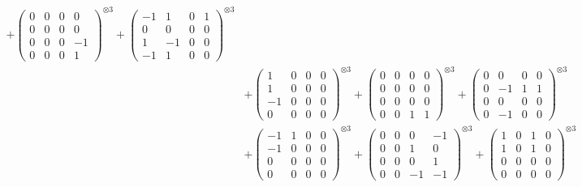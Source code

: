 \documentclass{article}
\begin{document}
{\begin{align}
            + \begin{pmatrix} 0 & 0 & 0 & 0 \\ 0 & 0 & 0 & 0 \\ 0 & 0 & 0 & -1 \\ 0 & 0 & 0 & 1 \end{pmatrix}^{\otimes 3} 
            + \begin{pmatrix} -1 & 1 & 0 & 1 \\ 0 & 0 & 0 & 0 \\ 1 & -1 & 0 & 0 \\ -1 & 1 & 0 & 0 \end{pmatrix}^{\otimes 3} \\
        &+ \label{Rs16-Rc11-Solution-12-c10} \begin{pmatrix} 1 & 0 & 0 & 0 \\ 1 & 0 & 0 & 0 \\ -1 & 0 & 0 & 0 \\ 0 & 0 & 0 & 0 \end{pmatrix}^{\otimes 3} 
            + \begin{pmatrix} 0 & 0 & 0 & 0 \\ 0 & 0 & 0 & 0 \\ 0 & 0 & 0 & 0 \\ 0 & 0 & 1 & 1 \end{pmatrix}^{\otimes 3} 
            + \begin{pmatrix} 0 & 0 & 0 & 0 \\ 0 & -1 & 1 & 1 \\ 0 & 0 & 0 & 0 \\ 0 & -1 & 0 & 0 \end{pmatrix}^{\otimes 3} \\
        &+ \label{Rs16-Rc11-Solution-12-c13} \begin{pmatrix} -1 & 1 & 0 & 0 \\ -1 & 0 & 0 & 0 \\ 0 & 0 & 0 & 0 \\ 0 & 0 & 0 & 0 \end{pmatrix}^{\otimes 3} 
            + \begin{pmatrix} 0 & 0 & 0 & -1 \\ 0 & 0 & 1 & 0 \\ 0 & 0 & 0 & 1 \\ 0 & 0 & -1 & -1 \end{pmatrix}^{\otimes 3} 
            + \begin{pmatrix} 1 & 0 & 1 & 0 \\ 1 & 0 & 1 & 0 \\ 0 & 0 & 0 & 0 \\ 0 & 0 & 0 & 0 \end{pmatrix}^{\otimes 3} \\

\end{align}}
\end{document}
